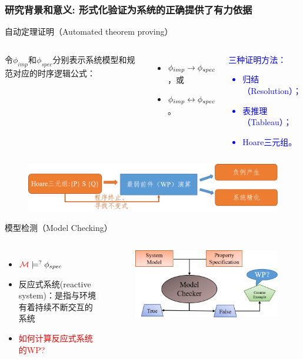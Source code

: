 \documentclass[aspectratio=1610, 9pt, CJK]{beamer}
\begin{document}
	\begin{frame}
		\frametitle{研究背景和意义: {\small 形式化验证为系统的正确提供了有力依据}} 
\begin{block}{自动定理证明（Automated theorem proving）}
		\begin{columns}
			令$\phi_{imp}$和$\phi_{spec}$分别表示系统模型和规范对应的时序逻辑公式：
			\begin{itemize}
				\item $\phi_{imp} \rightarrow \phi_{spec}$，或
				\item $\phi_{imp} \leftrightarrow \phi_{spec}$。
			\end{itemize}
	\textcolor{blue}{\qquad 三种证明方法：
		\begin{itemize}\setlength{\itemsep}{0.1pt }
			\item 归结（Resolution）；
			\item 表推理（Tableau）；
			\item Hoare三元组。
		\end{itemize}}
		\end{columns} 
	\begin{figure}
		\includegraphics[scale=0.35]{figures/hoareTriple}
	\end{figure}
	\end{block}
\vskip 0.5pt
	\begin{block}{模型检测（Model Checking）}
		\begin{columns}
			\column{0.5\textwidth} 
			\begin{itemize}
				\item $\textcolor{red}{{\cal M}} \models^? \phi_{spec}$
				\item 反应式系统(reactive system)：是指与环境有着持续不断交互的系统
				\item \textcolor{red}{如何计算反应式系统的WP?}
			\end{itemize}
			\column{0.5\textwidth}
			\begin{figure}
				\includegraphics[scale=0.4]{figures/MC}

\end{figure}
\end{columns}
\end{block}
\end{frame}
\end{document}
